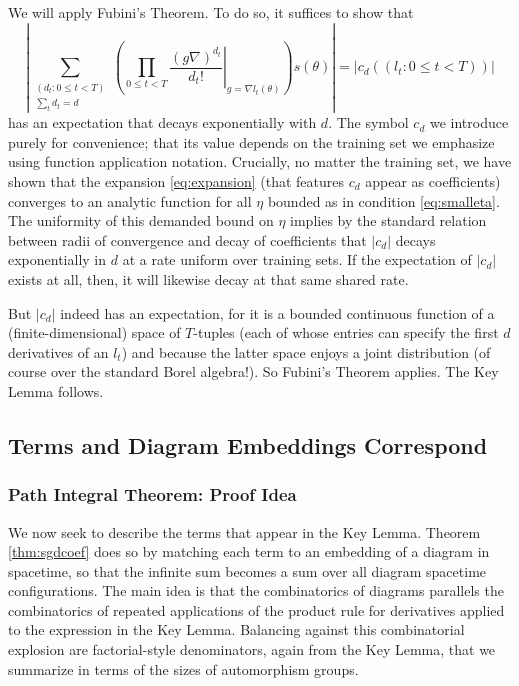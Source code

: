 \documentclass{article}
\newcommand{\wrap}[1]{\left(#1\right)}
\newcommand{\wabs}[1]{\left|#1\right|}
\begin{document}
            We will apply Fubini's Theorem.  To do so, it suffices to show that   
            $$
                \wabs{
                    \sum_{\substack{(d_t: 0\leq t<T) \\ \sum_t d_t = d}}
                    \wrap{
                        \prod_{0 \leq t < T} \left.
                            \frac{(g \nabla)^{d_t}}{d_t!}
                        \right|_{g=\nabla l_t(\theta)}
                    } s (\theta)
                }
                = \wabs{c_d((l_t: 0\leq t<T))} 
            $$
            has an expectation that decays exponentially with $d$.  The symbol
            $c_d$ we introduce purely for convenience; that its value depends
            on the training set we emphasize using function application
            notation.  Crucially, no matter the training set, we have shown
            that the expansion \ref{eq:expansion} (that features $c_d$ appear
            as coefficients) converges to an analytic function for all $\eta$
            bounded as in condition \ref{eq:smalleta}.  The uniformity of this
            demanded bound on $\eta$ implies by the standard relation between
            radii of convergence and decay of coefficients that $\wabs{c_d}$
            decays exponentially in $d$ at a rate uniform over training sets.
            If the expectation of $\wabs{c_d}$ exists at all, then, it will
            likewise decay at that same shared rate.
            
            But $\wabs{c_d}$ indeed has an expectation, for it is a bounded
            continuous function of a (finite-dimensional) space of $T$-tuples
            (each of whose entries can specify the first $d$ derivatives of an
            $l_t$) and because the latter space enjoys a joint distribution (of
            course over the standard Borel algebra!).  So Fubini's Theorem
            applies. The Key Lemma
            follows.   

    \subsection{Terms and Diagram Embeddings Correspond}
        \subsubsection*{Path Integral Theorem: Proof Idea}
            We now seek to describe the terms that appear in the Key Lemma. 
            Theorem \ref{thm:sgdcoef} does so by matching each term to an
            embedding of a diagram in spacetime, so that the infinite sum
            becomes a sum over all diagram spacetime configurations.
            The main idea is that the combinatorics of diagrams parallels the
            combinatorics of repeated applications of the product rule for
            derivatives applied to the expression in the Key Lemma. 
            Balancing against this combinatorial explosion are factorial-style 
            denominators, again from the Key Lemma, that we summarize in terms
            of the sizes of automorphism groups.
\end{document}

